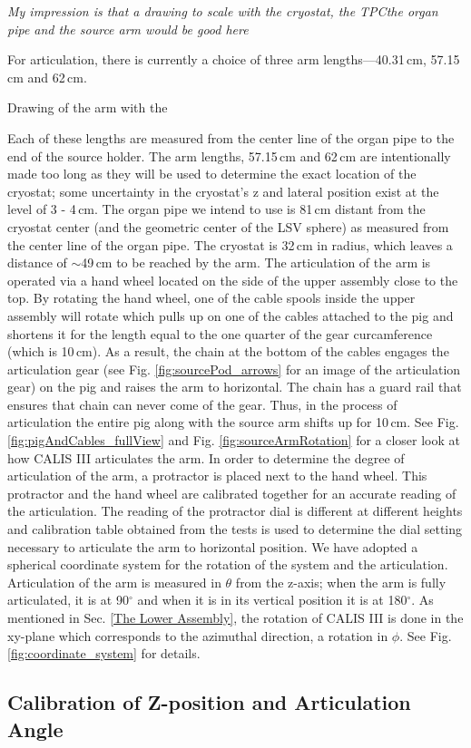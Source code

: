 \textit{My impression is that a drawing to scale with the cryostat, the TPCthe organ pipe and the source arm would be good here}

For articulation, there is currently a choice of three arm lengths---40.31\,cm,  57.15\,cm and 62\,cm.  

Drawing of the arm with the 


Each of these lengths are measured from the center line of the organ pipe to the end of the source holder.  The arm lengths, 57.15\,cm and 62\,cm are intentionally made too long as they will be used to determine the exact location of the cryostat; some uncertainty in the cryostat's z and lateral position exist at the level of 3 - 4\,cm. The organ pipe we intend to use is 81\,cm distant from the cryostat center (and the geometric center of the LSV sphere) as measured from the center line of the organ pipe. The cryostat is 32\,cm in radius, which leaves a distance of $\sim$49\,cm to be reached  by the arm.  The articulation of the arm is operated via a hand wheel located on the side of the upper assembly close to the top.  By rotating the hand wheel, one of the cable spools inside the upper assembly will rotate which pulls up on one of the cables attached to the pig and shortens it for the length equal to the one quarter of the gear curcamference (which is 10\,cm).  As a result, the chain at the bottom of the cables engages the articulation gear (see Fig. \ref{fig:sourcePod_arrows} for an image of the articulation gear) on the pig and raises the arm to horizontal.  The chain has a guard rail that ensures that chain can never come of the gear. Thus, in the process of articulation the entire pig along with the source arm shifts up for 10\,cm.  See Fig. \ref{fig:pigAndCables_fullView} and  Fig. \ref{fig:sourceArmRotation} for a closer look at how CALIS III articulates the arm. In order to determine the degree of articulation of the arm, a protractor is placed next to the hand wheel.  This protractor and the hand wheel are calibrated together for an accurate reading of the articulation. The reading of the protractor dial is different at different heights and calibration table obtained from the tests is used to determine the dial setting necessary to articulate the arm to horizontal position. We have adopted a spherical coordinate system for the rotation of the system and the articulation.  Articulation of the arm is measured in $\theta$ from the z-axis; when the arm is fully articulated, it is at 90$^{\circ}$ and when it is in its vertical position it is at 180$^{\circ}$.  As mentioned in Sec. \ref{The Lower Assembly}, the rotation of CALIS III is done in the xy-plane which corresponds to the azimuthal direction, a rotation in $\phi$.  See Fig. \ref{fig:coordinate_system} for details. 


\subsection{Calibration of Z-position and Articulation Angle}  